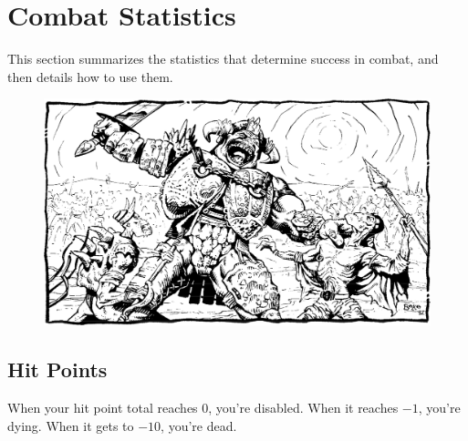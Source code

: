 \section{Combat Statistics}
This section summarizes the statistics that determine success in combat, and then details how to use them.



\begin{figure}[t!]
\centering
\includegraphics[width=\textwidth]{images/fighter-1.png}
\WOTC
\end{figure}



\subsection{Hit Points}
When your hit point total reaches 0, you're disabled. When it reaches $-1$, you're dying. When it gets to $-10$, you're dead.



